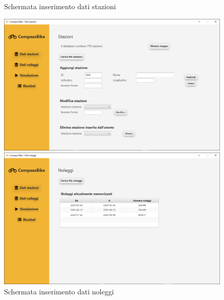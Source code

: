 \documentclass[a4paper, 12pt]{article}
\begin{document}
	\begin{figure}[H]
	\caption{Schermata inserimento dati stazioni}
	\label{stationsdata}
	\hfill \includegraphics[height=0.34\textheight]{resources/images/screenshot/StationsData.png} \hspace*{\fill}

	\caption{Schermata inserimento dati noleggi}
	\label{rentalsdata}
	\hfill \includegraphics[height=0.34\textheight]{resources/images/screenshot/RentalsData.png} \hspace*{\fill}
	\end{figure}	
\end{document}
